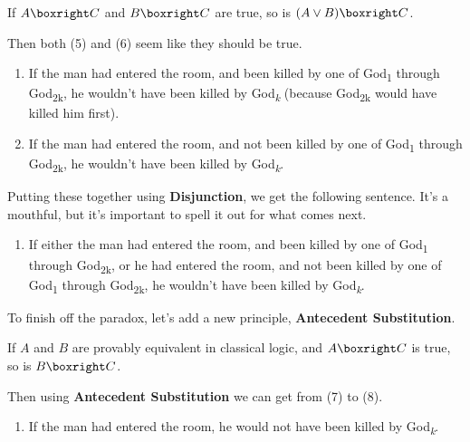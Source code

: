 \documentclass[
  11pt,
  letterpaper,
  DIV=11,
  numbers=noendperiod,
  twoside]{scrartcl}
\providecommand{\tightlist}{%
  \setlength{\itemsep}{0pt}\setlength{\parskip}{0pt}}
\begin{document}
\begin{description}
\tightlist
\item[Disjunction]
If \(A \boxright C\) and \(B \boxright C\) are true, so is
\((A \vee B) \boxright C\).
\end{description}

Then both (5) and (6) seem like they should be true.

\begin{enumerate}
\def\labelenumi{(\arabic{enumi})}
\setcounter{enumi}{4}
\tightlist
\item
  If the man had entered the room, and been killed by one of
  God\textsubscript{1} through God\textsubscript{2k}, he wouldn't have
  been killed by God\textsubscript{\emph{k}} (because
  God\textsubscript{2k} would have killed him first).
\item
  If the man had entered the room, and not been killed by one of
  God\textsubscript{1} through God\textsubscript{2k}, he wouldn't have
  been killed by God\textsubscript{\emph{k}}.
\end{enumerate}

Putting these together using \textbf{Disjunction}, we get the following
sentence. It's a mouthful, but it's important to spell it out for what
comes next.

\begin{enumerate}
\def\labelenumi{(\arabic{enumi})}
\setcounter{enumi}{6}
\tightlist
\item
  If either the man had entered the room, and been killed by one of
  God\textsubscript{1} through God\textsubscript{2k}, or he had entered
  the room, and not been killed by one of God\textsubscript{1} through
  God\textsubscript{2k}, he wouldn't have been killed by
  God\textsubscript{\emph{k}}.
\end{enumerate}

To finish off the paradox, let's add a new principle, \textbf{Antecedent
Substitution}.

\begin{description}
\tightlist
\item[Antecedent Substitution]
If \(A\) and \(B\) are provably equivalent in classical logic, and
\(A \boxright C\) is true, so is \(B \boxright C\).
\end{description}

Then using \textbf{Antecedent Substitution} we can get from (7) to (8).

\begin{enumerate}
\def\labelenumi{(\arabic{enumi})}
\setcounter{enumi}{7}
\tightlist
\item
  If the man had entered the room, he would not have been killed by
  God\textsubscript{\emph{k}}.
\end{enumerate}
\end{document}
